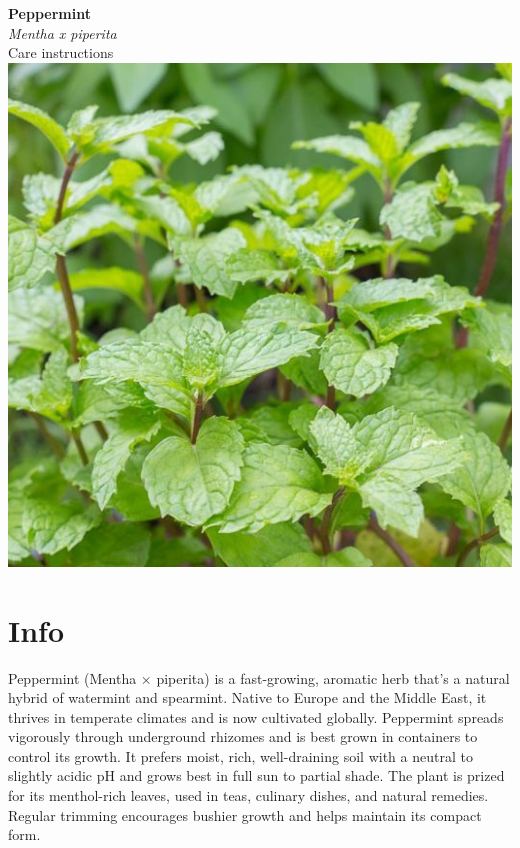 \documentclass{article}
\begin{document}
\begin{center}
{\fontsize{36}{24}\selectfont \textbf{Peppermint}} \\
{\fontsize{18}{24}\selectfont \textit{Mentha x piperita}} \\
\vspace{30pt}
{\fontsize{20}{24}\selectfont Care instructions}\\
\vspace{30pt} 
\includegraphics[width=1.0\textwidth]{intermediate/croppedimages/Peppermint.jpg}
\end{center}

\newpage

\section*{Info}
Peppermint (Mentha × piperita) is a fast-growing, aromatic herb that’s a natural hybrid of watermint and spearmint. Native to Europe and the Middle East, it thrives in temperate climates and is now cultivated globally. Peppermint spreads vigorously through underground rhizomes and is best grown in containers to control its growth. It prefers moist, rich, well-draining soil with a neutral to slightly acidic pH and grows best in full sun to partial shade. The plant is prized for its menthol-rich leaves, used in teas, culinary dishes, and natural remedies. Regular trimming encourages bushier growth and helps maintain its compact form.
\end{document}
